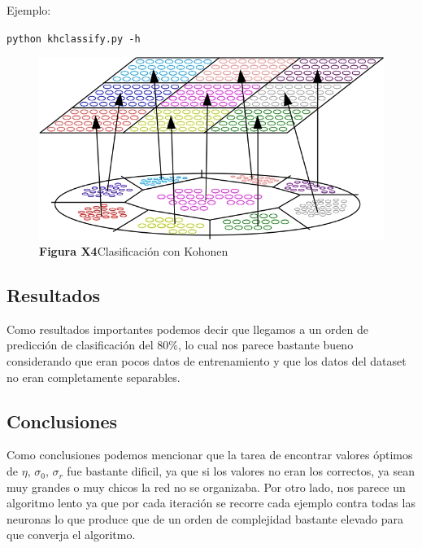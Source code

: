 Ejemplo:

\noindent\texttt{python khclassify.py -h} \\

\begin{figure}[ht!]
	\centering
	\includegraphics[width=0.8\linewidth]{img/parte2-kohonen9clases.jpg}
	\caption{\textbf{Figura X4}Clasificación con Kohonen}
\end{figure}


\subsection{Resultados}
Como resultados importantes podemos decir que llegamos a un orden de predicción de clasificación del 80$\%$, lo cual nos parece bastante bueno considerando que eran pocos datos de entrenamiento y que los datos del dataset no eran completamente separables.

\subsection{Conclusiones}
Como conclusiones podemos mencionar que la tarea de encontrar valores óptimos de $\eta$, $\sigma_{0}$, $\sigma_{r}$ fue bastante dificil, ya que si los valores no eran los correctos, ya sean muy grandes o muy chicos la red no se organizaba.
Por otro lado, nos parece un algoritmo lento ya que por cada iteración se recorre cada ejemplo contra todas las neuronas lo que produce que de un orden de complejidad bastante elevado para que converja el algoritmo.